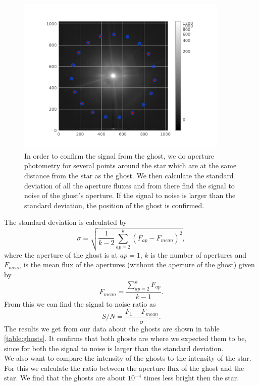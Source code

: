 \begin{figure}[H]
	\centering
		\includegraphics[width=0.9\textwidth]{pics/aperture_photometry_19_ghost1.pdf}
		\caption{In order to confirm the signal from the ghost, we do aperture photometry for several points around the star which are at the same distance from the star as the ghost. We then calculate the standard deviation of all the aperture fluxes and from there find the signal to noise of the ghost's aperture. If the signal to noise is larger than the standard deviation, the position of the ghost is confirmed.}
		\label{fig:ap_phot_gh1}
\end{figure}
The standard deviation is calculated by
\begin{equation}
	\sigma = \sqrt{\frac{1}{k-2} \sum_{ap=2}^{k} (F_{ap} - F_{mean})^2} ,
\end{equation}
where the aperture of the ghost is at $ap=1$, $k$ is the number of apertures and $F_{mean}$ is the mean flux of the apertures (without the aperture of the ghost) given by
\begin{equation}
	F_{mean} = \frac{\sum_{ap=2}^{k} F_{ap}}{k-1} .
\end{equation}
From this we can find the signal to noise ratio as
\begin{equation}
	S/N = \frac{F_1 - F_{mean}}{\sigma} .
\end{equation}
The results we get from our data about the ghosts are shown in table \ref{table:ghosts}. It confirms that both ghosts are where we expected them to be, since for both the signal to noise is larger than the standard deviation. \\
We also want to compare the intensity of the ghosts to the intensity of the star. For this we calculate the ratio between the aperture flux of the ghost and the star. We find that the ghosts are about $10^{-4}$ times less bright then the star. 

